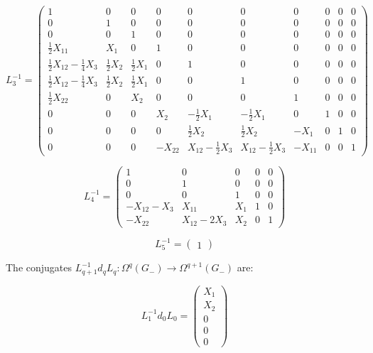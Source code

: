 \documentclass[reqno,12pt]{amsart}
\theoremstyle{plain}
\theoremstyle{definition}
\begin{document}
$$
L^{-1}_3=\left(\begin{array}{c|cc|cccc|cc|c}
1&               0&     0&     0&    0&           0&           0&    0&0&0\\\hline
0&               1&     0&     0&    0&           0&           0&    0&0&0\\
0&               0&     1&     0&    0&           0&           0&    0&0&0\\\hline
\tfrac12X_{11}&        X_1&    0&     1&    0&           0&           0&    0&0&0\\
\tfrac12X_{12}-\tfrac14X_3&\tfrac12X_2&\tfrac12X_1&0&    1&           0&           0&    0&0&0\\
\tfrac12X_{12}-\tfrac14X_3&\tfrac12X_2&\tfrac12X_1&0&    0&           1&           0&    0&0&0\\
\tfrac12X_{22}&        0&     X_2&    0&    0&           0&           1&    0&0&0\\\hline
0&               0&     0&     X_2&   -\tfrac12X_1&     -\tfrac12X_1&     0&    1&0&0\\
0&               0&     0&     0&    \tfrac12X_2&      \tfrac12X_2&      -X_1&  0&1&0\\\hline
0&               0&     0&     -X_{22}&X_{12}-\tfrac12X_3&X_{12}-\tfrac12X_3&-X_{11}&0&0&1
\end{array}\right)
$$

$$
L^{-1}_4=\left(\begin{array}{cc|c|cc}
1&        0&         0& 0&0\\
0&        1&         0& 0&0\\\hline
0&        0&         1& 0&0\\\hline
-X_{12}-X_3&X_{11}&      X_1&1&0\\
-X_{22}&    X_{12}-2X_3&X_2&0&1
\end{array}\right)
$$

$$
L^{-1}_5=\left(\begin{array}{c}
1
\end{array}\right)
$$

The conjugates $L_{q+1}^{-1}d_qL_q\colon\Omega^q(G_-)\to\Omega^{q+1}(G_-)$ are:

$$
L^{-1}_1d_0L_0=\left(\begin{array}{c}
X_1\\
X_2\\\hline
0\\\hline
0\\
0
\end{array}\right)
$$
\end{document}
